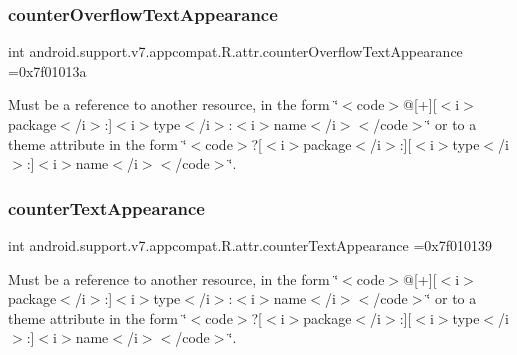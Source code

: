 \subsubsection{\texorpdfstring{counter\+Overflow\+Text\+Appearance}{counterOverflowTextAppearance}}
{\footnotesize\ttfamily int android.\+support.\+v7.\+appcompat.\+R.\+attr.\+counter\+Overflow\+Text\+Appearance =0x7f01013a\hspace{0.3cm}{\ttfamily [static]}}

Must be a reference to another resource, in the form \char`\"{}$<$code$>$@\mbox{[}+\mbox{]}\mbox{[}$<$i$>$package$<$/i$>$\+:\mbox{]}$<$i$>$type$<$/i$>$\+:$<$i$>$name$<$/i$>$$<$/code$>$\char`\"{} or to a theme attribute in the form \char`\"{}$<$code$>$?\mbox{[}$<$i$>$package$<$/i$>$\+:\mbox{]}\mbox{[}$<$i$>$type$<$/i$>$\+:\mbox{]}$<$i$>$name$<$/i$>$$<$/code$>$\char`\"{}. \mbox{\label{classandroid_1_1support_1_1v7_1_1appcompat_1_1R_1_1attr_a86b164196b84bd8f7b817acc52c5fba9}} 
\subsubsection{\texorpdfstring{counter\+Text\+Appearance}{counterTextAppearance}}
{\footnotesize\ttfamily int android.\+support.\+v7.\+appcompat.\+R.\+attr.\+counter\+Text\+Appearance =0x7f010139\hspace{0.3cm}{\ttfamily [static]}}

Must be a reference to another resource, in the form \char`\"{}$<$code$>$@\mbox{[}+\mbox{]}\mbox{[}$<$i$>$package$<$/i$>$\+:\mbox{]}$<$i$>$type$<$/i$>$\+:$<$i$>$name$<$/i$>$$<$/code$>$\char`\"{} or to a theme attribute in the form \char`\"{}$<$code$>$?\mbox{[}$<$i$>$package$<$/i$>$\+:\mbox{]}\mbox{[}$<$i$>$type$<$/i$>$\+:\mbox{]}$<$i$>$name$<$/i$>$$<$/code$>$\char`\"{}. \mbox{\label{classandroid_1_1support_1_1v7_1_1appcompat_1_1R_1_1attr_aa4815525f2f6a0d8ad7614131e4db6d6}} 
